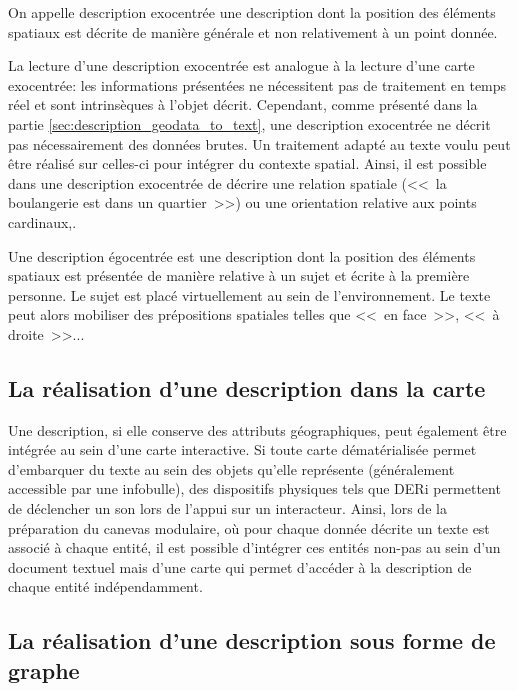 \label{sec:description_textuelle}

On appelle description exocentrée une description dont la position des éléments spatiaux est décrite de manière générale et non relativement à un point donnée.

La lecture d'une description exocentrée est analogue à la lecture d'une carte exocentrée: les informations présentées ne nécessitent pas de traitement en temps réel et sont intrinsèques à l'objet décrit. Cependant, comme présenté dans la partie \ref{sec:description_geodata_to_text}, une description exocentrée ne décrit pas nécessairement des données brutes. Un traitement adapté au texte voulu peut être réalisé sur celles-ci pour intégrer du contexte spatial. Ainsi, il est possible dans une description exocentrée de décrire une relation spatiale (<<~la boulangerie est dans un quartier~>>) ou une orientation relative aux points cardinaux,.

\newpar{}

Une description égocentrée est une description dont la position des éléments spatiaux est présentée de manière relative à un sujet et écrite à la première personne. Le sujet est placé virtuellement au sein de l'environnement. Le texte peut alors mobiliser des prépositions spatiales telles que <<~en face~>>, <<~à droite~>>...

\subsection{La réalisation d'une description dans la carte}

\label{sec:description_carte}

Une description, si elle conserve des attributs géographiques, peut également être intégrée au sein d'une carte interactive. Si toute carte dématérialisée permet d'embarquer du texte au sein des objets qu'elle représente (généralement accessible par une infobulle), des dispositifs physiques tels que DERi \citep{Brock2012} permettent de déclencher un son lors de l'appui sur un interacteur. Ainsi, lors de la préparation du canevas modulaire, où pour chaque donnée décrite un texte est associé à chaque entité, il est possible d'intégrer ces entités non-pas au sein d'un document textuel mais d'une carte qui permet d'accéder à la description de chaque entité indépendamment.

\subsection{La réalisation d'une description sous forme de graphe}

